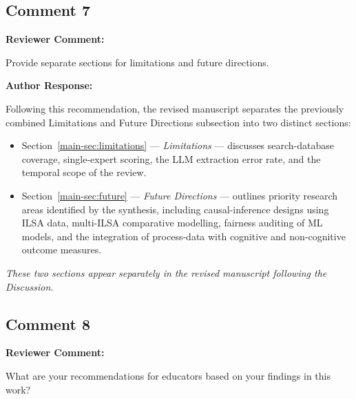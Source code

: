\documentclass[12pt, a4paper]{article}
\newcommand{\R}[1]{Section~\ref{main-#1}}
\newenvironment{reviewercomment}{%
  \begin{mdframed}[linecolor=reviewercolor, linewidth=1.5pt,
    backgroundcolor=reviewercolor!6, innertopmargin=8pt, innerbottommargin=8pt]
  \color{reviewercolor}\textbf{Reviewer Comment:}\normalcolor\par\smallskip
}{%
  \end{mdframed}\medskip
}
\newenvironment{authorresponse}{%
  \begin{mdframed}[linecolor=authorcolor, linewidth=1pt,
    backgroundcolor=authorcolor!5, innertopmargin=8pt, innerbottommargin=8pt]
  \color{authorcolor}\textbf{Author Response:}\normalcolor\par\smallskip
}{%
  \end{mdframed}\bigskip
}
\newcommand{\changed}[1]{\textcolor{changedcolor}{\textit{#1}}}
\begin{document}
\subsection*{Comment 7}

\begin{reviewercomment}
Provide separate sections for limitations and future directions.
\end{reviewercomment}

\begin{authorresponse}
Following this recommendation, the revised manuscript separates the
previously combined Limitations and Future Directions subsection into
two distinct sections:

\begin{itemize}[leftmargin=*]
  \item \R{sec:limitations} --- \textit{Limitations} --- discusses
    search-database coverage, single-expert scoring, the LLM extraction
    error rate, and the temporal scope of the review.
  \item \R{sec:future} --- \textit{Future Directions} --- outlines
    priority research areas identified by the synthesis, including
    causal-inference designs using ILSA data, multi-ILSA comparative
    modelling, fairness auditing of ML models, and the integration of
    process-data with cognitive and non-cognitive outcome measures.
\end{itemize}

\changed{These two sections appear separately in the revised manuscript
following the Discussion.}
\end{authorresponse}

\subsection*{Comment 8}

\begin{reviewercomment}
What are your recommendations for educators based on your findings in this
work?
\end{reviewercomment}
\end{document}
